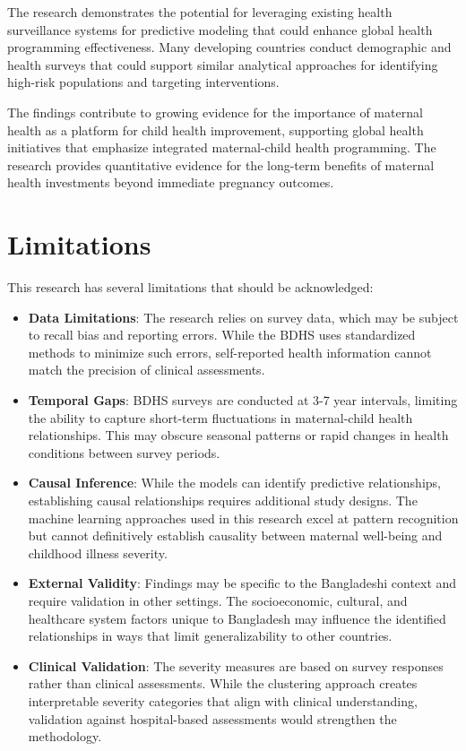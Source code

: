 \documentclass[12pt]{report}
\begin{document}
The research demonstrates the potential for leveraging existing health surveillance systems for predictive modeling that could enhance global health programming effectiveness. Many developing countries conduct demographic and health surveys that could support similar analytical approaches for identifying high-risk populations and targeting interventions.

The findings contribute to growing evidence for the importance of maternal health as a platform for child health improvement, supporting global health initiatives that emphasize integrated maternal-child health programming. The research provides quantitative evidence for the long-term benefits of maternal health investments beyond immediate pregnancy outcomes.

\section{Limitations}

This research has several limitations that should be acknowledged:

\begin{itemize}
    \item \textbf{Data Limitations}: The research relies on survey data, which may be subject to recall bias and reporting errors. While the BDHS uses standardized methods to minimize such errors, self-reported health information cannot match the precision of clinical assessments.
    
    \item \textbf{Temporal Gaps}: BDHS surveys are conducted at 3-7 year intervals, limiting the ability to capture short-term fluctuations in maternal-child health relationships. This may obscure seasonal patterns or rapid changes in health conditions between survey periods.
    
    \item \textbf{Causal Inference}: While the models can identify predictive relationships, establishing causal relationships requires additional study designs. The machine learning approaches used in this research excel at pattern recognition but cannot definitively establish causality between maternal well-being and childhood illness severity.
    
    \item \textbf{External Validity}: Findings may be specific to the Bangladeshi context and require validation in other settings. The socioeconomic, cultural, and healthcare system factors unique to Bangladesh may influence the identified relationships in ways that limit generalizability to other countries.
    
    \item \textbf{Clinical Validation}: The severity measures are based on survey responses rather than clinical assessments. While the clustering approach creates interpretable severity categories that align with clinical understanding, validation against hospital-based assessments would strengthen the methodology.
\end{itemize}
\end{document}
